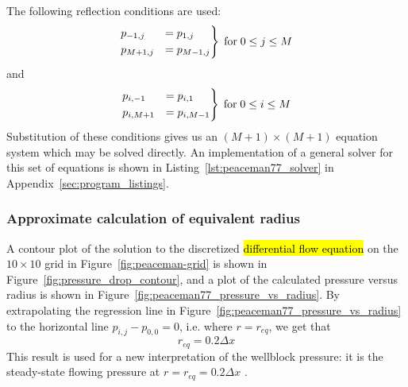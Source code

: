 The following reflection conditions are used:
\begin{equation}
    \begin{rcases}
        p_{-1,j} &= p_{1,j} \\
        p_{M+1,j} &= p_{M-1,j}
    \end{rcases} \; \mathrm{for} \; 0\leq j \leq M
\end{equation}
and
\begin{equation}
    \begin{rcases}
        p_{i,-1} &= p_{i,1} \\
        p_{i,M+1} &= p_{i,M-1}
    \end{rcases} \; \mathrm{for} \; 0\leq i \leq M
\end{equation}
Substitution of these conditions gives us an $(M+1)\times (M+1)$ equation system which may be solved directly. An implementation of a general solver for this set of equations is shown in Listing~\ref{lst:peaceman77_solver} in Appendix~\ref{sec:program_listings}.


\subsubsection{Approximate calculation of equivalent radius} %
\label{ssub:approximate_calculation_of_equivalent_radius}
A contour plot of the solution to the discretized \hl{differential flow equation} on the $10 \times 10$ grid in Figure~\ref{fig:peaceman-grid} is shown in Figure~\ref{fig:pressure_drop_contour}, and a plot of the calculated pressure versus radius is shown in Figure~\ref{fig:peaceman77_pressure_vs_radius}. By extrapolating  the regression line in Figure~\ref{fig:peaceman77_pressure_vs_radius} to the horizontal line $p_{i,j}-p_{0,0}=0$, i.e. where $r=r_{eq}$, we get that
\begin{equation}
    r_{eq} = 0.2 \Delta x
\end{equation}
This result is used for a new interpretation of the wellblock pressure: it is the steady-state flowing pressure at $r=r_{eq}=0.2 \Delta x$ \cite{Peaceman1978Interpretation}.

